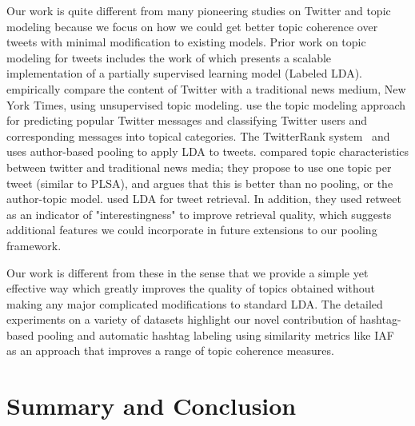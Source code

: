 \documentclass[10pt,a5paper,twoside]{article}
\begin{document}
Our work is quite different from many pioneering studies on Twitter
and topic modeling because we focus on how we could get better
topic coherence over tweets with minimal modification to existing
models. Prior work on topic modeling for tweets includes the work of
\cite{ramage} which presents a scalable implementation of a partially
supervised learning model (Labeled LDA). %
 \cite{wayne} empirically compare the content of Twitter
with a traditional news medium, New York Times, using unsupervised
topic modeling. \cite{hong} use the topic modeling approach for
predicting popular Twitter messages and classifying Twitter users and
corresponding messages into topical categories. %
The {T}witterRank system~\cite{Weng2010wsdm} and \cite{hong} uses author-based pooling to apply LDA to tweets. \cite{wayne} compared
topic characteristics between twitter and traditional news media; they propose to use one topic per tweet (similar to
PLSA), and argues that this is better than no
pooling, or the author-topic model. %
 \cite{Naveed2011cikm} used LDA for tweet retrieval. In
addition, they used retweet as an indicator of "interestingness" to
improve retrieval quality, which suggests additional features we
could incorporate in future extensions to our pooling framework.

Our work is different from these in the sense that we provide a simple
yet effective way which greatly improves the quality of topics
obtained without making any major complicated modifications to
standard LDA. The detailed experiments on a variety of datasets
highlight our novel contribution of hashtag-based pooling and automatic
hashtag labeling using similarity metrics like IAF~\cite{iaf} as an
approach that improves a range of topic coherence measures.

\section{Summary and Conclusion}

\label{sec:conclusion}
\end{document}
